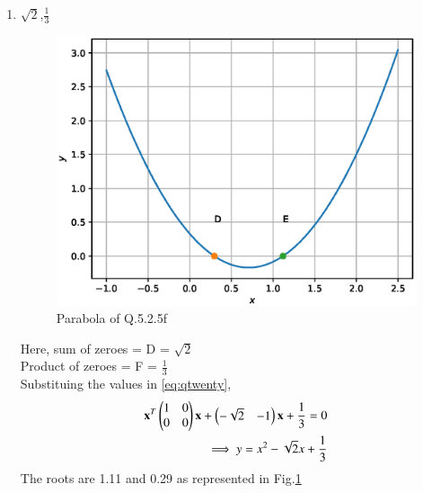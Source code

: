 \begin{enumerate}[label=\thesection.\arabic*.,ref=\thesection.\theenumi]
\begin{enumerate}
		\item $\sqrt{2}$,$\frac{1}{3}$
	\begin{figure}[!ht]
	\centering
	\includegraphics[width=\columnwidth]{./figs/conics/q20f.eps}
	\caption{Parabola of Q.5.2.5f}
	\label{fig:qtof}	
	\end{figure}

		
\solution
Here, sum of zeroes = D = $\sqrt{2}$\\
Product of zeroes = F = $\frac{1}{3}$\\
Substituing the values in \ref{eq:qtwenty},\\
\begin{align}
\mathbf{x}^T\begin{pmatrix}1&0\\0&0\end{pmatrix}\mathbf{x}  + \begin{pmatrix}-\sqrt{2}&-1\end{pmatrix}\mathbf{x} + \frac{1}{3} = 0\\
\implies y = x^2 - \sqrt{2}x + \frac{1}{3}
\end{align}
The roots are 1.11 and 0.29 as represented in Fig.\ref{fig:qtof}
	\end{enumerate}
\end{enumerate}
